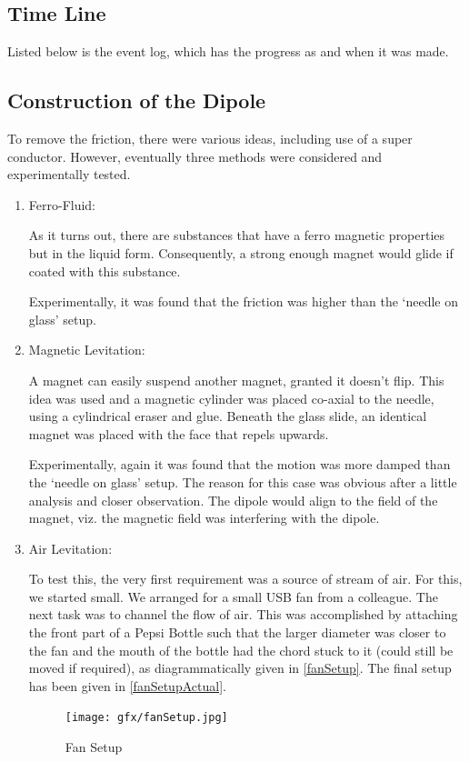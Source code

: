 	\subsection{Time Line}
		Listed below is the event log, which has the progress as and when it was made.
		
	
	\subsection{Construction of the Dipole}
		To remove the friction, there were various ideas, including use of a super conductor. However, eventually three methods were considered and experimentally tested.
		\begin{enumerate}
			\item Ferro-Fluid: 
					\par
					As it turns out, there are substances that have a ferro magnetic properties but in the liquid form. Consequently, a strong enough magnet would glide if coated with this substance.
					\par
					Experimentally, it was found that the friction was higher than the `needle on glass' setup. 
			\item Magnetic Levitation:
					\par
					A magnet can easily suspend another magnet, granted it doesn't flip. This idea was used and a magnetic cylinder was placed co-axial to the needle, using a cylindrical eraser and glue. Beneath the glass slide, an identical magnet was placed with the face that repels upwards.
					\par
					Experimentally, again it was found that the motion was more damped than the `needle on glass' setup. The reason for this case was obvious after a little analysis and closer observation. The dipole would align to the field of the magnet, viz. the magnetic field was interfering with the dipole.
			\item Air Levitation:
					\par
					To test this, the very first requirement was a source of stream of air. For this, we started small. We arranged for a small USB fan from a colleague. The next task was to channel the flow of air. This was accomplished by attaching the front part of a Pepsi Bottle such that the larger diameter was closer to the fan and the mouth of the bottle had the chord stuck to it (could still be moved if required), as diagrammatically given in \autoref{fanSetup}. The final setup has been given in \autoref{fanSetupActual}.
					\begin{figure}[bth]
						\begin{center}
							\texttt{[image: gfx/fanSetup.jpg]}
						\end{center}
					\caption[Fan Setup]{Fan Setup}
					\label{fanSetup}
					\end{figure}


\end{enumerate}
